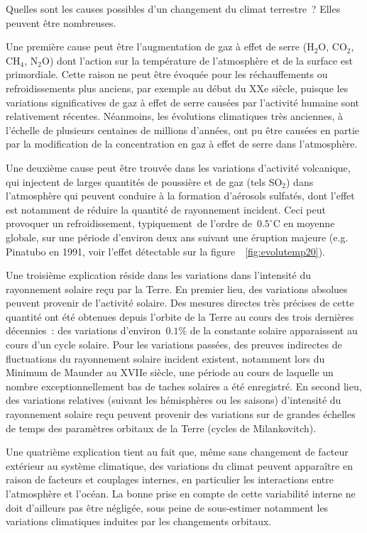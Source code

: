 \sk
Quelles sont les causes possibles d'un changement du climat terrestre~? Elles peuvent être nombreuses.

\begin{finger}
\item Une première cause peut être l'augmentation de gaz à effet de serre (H$_2$O, CO$_2$, CH$_4$, N$_2$O) dont l'action sur la température de l'atmosphère et de la surface est primordiale. Cette raison ne peut être évoquée pour les réchauffements ou refroidissements plus anciens, par exemple au début du XXe siècle, puisque les variations significatives de gaz à effet de serre causées par l'activité humaine sont relativement récentes. Néanmoins, les évolutions climatiques très anciennes, à l'échelle de plusieurs centaines de millions d'années, ont pu être causées en partie par la modification de la concentration en gaz à effet de serre dans l'atmosphère.
\item Une deuxième cause peut être trouvée dans les variations d'activité volcanique, qui injectent de larges quantités de poussière et de gaz (tels SO$_2$) dans l'atmosphère qui peuvent conduire à la formation d'aérosols sulfatés, dont l'effet est notamment de réduire la quantité de rayonnement incident. Ceci peut provoquer un refroidissement, typiquement~de l'ordre de~$0.5^{\circ}$C en moyenne globale, sur une période d'environ deux ans suivant une éruption majeure (e.g. Pinatubo en 1991, voir l'effet détectable sur la figure~~\ref{fig:evolutemp20}).
\item Une troisième explication réside dans les variations dans l'intensité du rayonnement solaire reçu par la Terre. En premier lieu, des variations absolues peuvent provenir de l'activité solaire. Des mesures directes très précises de cette quantité ont été obtenues depuis l'orbite de la Terre au cours des trois dernières décennies~: des variations d'environ~$0.1\%$ de la constante solaire apparaissent au cours d'un cycle solaire. Pour les variations passées, des preuves indirectes de fluctuations du rayonnement solaire incident existent, notamment lors du Minimum de Maunder au XVIIe siècle, une période au cours de laquelle un nombre exceptionnellement bas de taches solaires a été enregistré. En second lieu, des variations relatives (suivant les hémisphères ou les saisons) d'intensité du rayonnement solaire reçu peuvent provenir des variations sur de grandes échelles de temps des paramètres orbitaux de la Terre (cycles de Milankovitch).
\item Une quatrième explication tient au fait que, même sans changement de facteur extérieur au système climatique, des variations du climat peuvent apparaître en raison de facteurs et couplages internes, en particulier les interactions entre l'atmosphère et l'océan. La bonne prise en compte de cette variabilité interne ne doit d'ailleurs pas être négligée, sous peine de sous-estimer notamment les variations climatiques induites par les changements orbitaux.
\end{finger}

